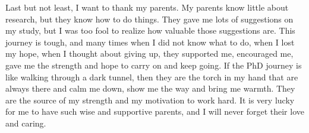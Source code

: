 \begin{acknowledgements}
Last but not least, I want to thank my parents. My parents know little
about research, but they know how to do things. They gave me lots of 
suggestions on my study, but I was too fool to realize how valuable those 
suggestions are. This journey is tough, and many times when I did not
know what to do, when I lost my hope, when I thought about giving up,
they supported me, encouraged me, gave me the strength and hope to 
carry on and keep going. If the PhD journey is like walking through a
dark tunnel, then they are the torch in my hand that are always there and
calm me down, show me the way and bring me warmth. They are the source of 
my strength and my motivation to work hard. It is very lucky for me to have 
such wise and supportive parents, and I will never forget their love 
and caring.
\end{acknowledgements}
